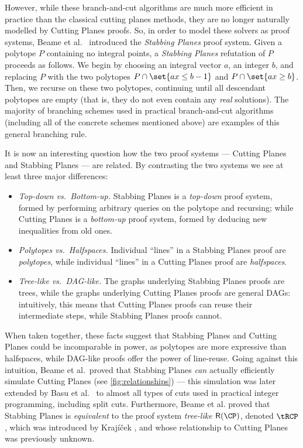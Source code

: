 However, while these branch-and-cut algorithms are much more efficient in practice than the classical cutting planes methods, they are no longer naturally modelled by Cutting Planes proofs.
So, in order to model these solvers as proof systems, Beame et al.~\cite{BeameFIKPPR18} introduced the \emph{Stabbing Planes} proof system.
%
%
Given a polytope $P$ containing no integral points, a \emph{Stabbing Planes} refutation of $P$ proceeds as follows.
We begin by choosing an integral vector $a$, an integer $b$, and replacing $P$ with the two polytopes $P \cap \set{ax \leq b-1}$ and $P \cap \set{ax \geq b}$.
Then, we recurse on these two polytopes, continuing until all descendant polytopes are empty (that is, they do not even contain any \emph{real} solutions).
The majority of branching schemes used in practical branch-and-cut algorithms (including all of the concrete schemes mentioned above) are examples of this general branching rule.

It is now an interesting question how the two proof systems --- Cutting Planes and Stabbing Planes --- are related.
By contrasting the two systems we see at least three major differences:
\begin{itemize}
\item \emph{Top-down vs.~Bottom-up.} Stabbing Planes is a \emph{top-down} proof system, formed by performing arbitrary queries on the polytope and recursing; while Cutting Planes is a \emph{bottom-up} proof system, formed by deducing new inequalities from old ones.  
%
%
%
%
%
%
%
	\item \emph{Polytopes vs.~Halfspaces.} Individual ``lines'' in a Stabbing Planes proof are \emph{polytopes}, while individual ``lines'' in a Cutting Planes proof are \emph{halfspaces}.  
	\item \emph{Tree-like vs.~DAG-like.} The graphs underlying Stabbing Planes proofs are trees, while the graphs underlying Cutting Planes proofs are general DAGs: intuitively, this means that Cutting Planes proofs can %
reuse  %
their intermediate steps, while Stabbing Planes proofs cannot.
\end{itemize}
When taken together, these facts suggest that Stabbing Planes and Cutting Planes could be incomparable in power, as polytopes are more expressive than halfspaces, while DAG-like proofs offer the power of line-reuse.
Going against this intuition, Beame et al.~proved that Stabbing Planes \emph{can} actually efficiently simulate Cutting Planes \cite{BeameFIKPPR18} (see \autoref{fig:relationships}) --- this simulation was later extended by Basu et al.~\cite{BasuCDJ21} to almost all types of cuts used in practical integer programming, including split cuts.
Furthermore, Beame et al. proved that Stabbing Planes is \emph{equivalent} to the proof system \emph{tree-like $\mathsf{R}(\CP)$}, denoted $\tRCP$, which was introduced by Kraj\'{i}\v{c}ek \cite{Krajicek98}, and whose relationship to Cutting Planes was previously unknown.

